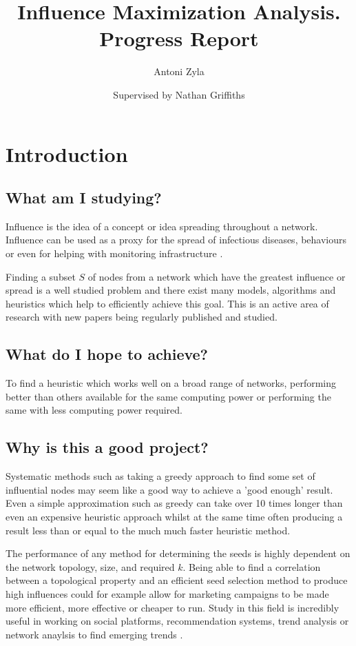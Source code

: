 \documentclass{article}
\title{\textbf{Influence Maximization Analysis. Progress Report}}
\author{Antoni Zyla \and Supervised by Nathan Griffiths}
\date{}
\begin{document}
\maketitle
\linespread{1.25}

\tableofcontents

\newpage

\section{Introduction}
\subsection{What am I studying?}

Influence is the idea of a concept or idea spreading throughout a network.
Influence can be used as a proxy for the spread of infectious diseases, behaviours \cite{archbold2024cvd} or even for helping with monitoring infrastructure \cite{celf}.

Finding a subset $S$ of nodes from a network which have the greatest influence or spread is a well studied problem and there exist many models, algorithms and heuristics which help to efficiently achieve this goal.
This is an active area of research with new papers being regularly published and studied.

\subsection{What do I hope to achieve?}
To find a heuristic which works well on a broad range of networks, performing better than others available for the same computing power or performing the same with less computing power required.

\subsection{Why is this a good project?}

Systematic methods such as taking a greedy approach to find some set of influential nodes may seem like a good way to achieve a 'good enough' result.
Even a simple approximation such as greedy can take over 10 times longer than even an expensive heuristic approach whilst at the same time often producing a result less than or equal to the much much faster heuristic method.

The performance of any method for determining the seeds is highly dependent on the network topology, size, and required $k$.
Being able to find a correlation between a topological property and an efficient seed selection method to produce high influences could for example allow for marketing campaigns to be made more efficient, more effective or cheaper to run.
Study in this field is incredibly useful in working on social platforms, recommendation systems, trend analysis or network anaylsis to find emerging trends \cite{kempe2003}.
\end{document}

